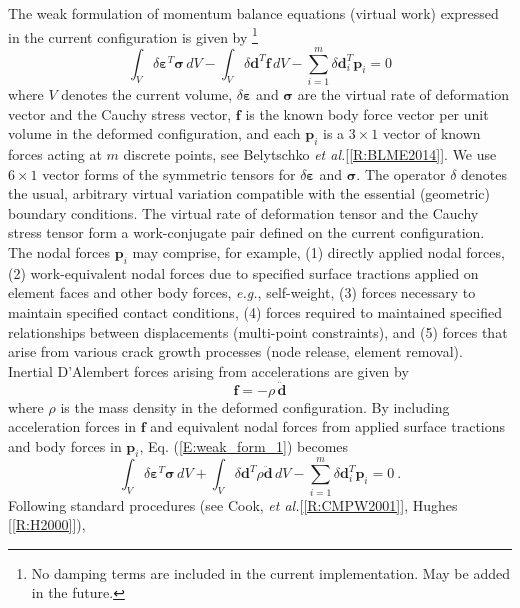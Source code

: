 \documentclass[11pt]{report}
\numberwithin{equation}{section}
\newcommand{\eg}{\emph{e.g.},\xspace}
\newcommand{\ti}{\emph}
\newcommand{\etal}{\ti{et al.}\xspace}
\begin{document}
The weak formulation of momentum balance equations (virtual work) 
expressed in the current configuration is given by \footnote{No 
damping terms are included in the current implementation. May be added in the future.}	
%
\begin{equation}\label{E:weak_form_1}
\int_{V}\delta \bm{\varepsilon}^T \bm{\sigma}\, dV -\int_{V}\delta 
\bm{d}^T \bm{f} \, dV - \sum_{i=1}^m \delta \bm{d}_i^T \bm{p}_i = 0
\end{equation}
%
\noindent where $V$ denotes the current volume, $\delta \bm{\varepsilon}$ and 
$\bm{\sigma}$ are the virtual rate of deformation 
vector and the Cauchy stress vector, $\bm{f}$ is the known body force vector 
per unit volume in the deformed 
configuration, and each $\bm{p}_i$ is a $3 \times 1$ vector of known forces acting 
at $m$ discrete 
points, see Belytschko \etal  [\ref{R:BLME2014}]. 
We use $6 \times 1$ vector forms 
of the symmetric tensors for $\delta \bm{\varepsilon}$ and $\bm{\sigma}$. 
The operator $\delta$ denotes the usual, arbitrary  virtual 
variation compatible with the essential (geometric)
boundary conditions. The virtual rate of deformation tensor and the Cauchy stress tensor form 
a work-conjugate pair defined on the current configuration.
The nodal forces $\bm{p}_i$ may comprise, for example, (1) directly applied nodal 
forces, (2) work-equivalent 
nodal forces due to specified surface tractions applied on element 
faces and other body forces, \eg self-weight, (3) forces necessary to maintain specified
contact conditions, (4) forces
required to maintained specified relationships between displacements
(multi-point constraints), and (5) forces that arise from various crack growth processes
(node release, element removal). Inertial D'Alembert forces arising 
from accelerations are given by
%
\begin{equation}\label{E:f definition}
\bm{f} = - \rho\, \ddot{\bm{d}}
\end{equation}
%
\noindent where $\rho$ is the mass density in the deformed configuration. 
By including acceleration forces in $\bm{f}$ and equivalent nodal forces from
applied surface tractions and body forces in $\bm{p}_i$, Eq. (\ref{E:weak_form_1}) becomes	
%
\begin{equation}\label{E:weak_form_2}
\int_{V}\delta \bm{\varepsilon}^T \bm{\sigma}\, dV + \int_{V}\delta \bm{d}^T  
\rho \ddot{\bm{d}} \, dV - \sum_{i=1}^m \delta \bm{d}_i^T \bm{p}_i = 0\ .
\end{equation}
%
\noindent Following standard procedures (see Cook, \etal  [\ref{R:CMPW2001}], Hughes [\ref {R:H2000}]), 
\end{document}
